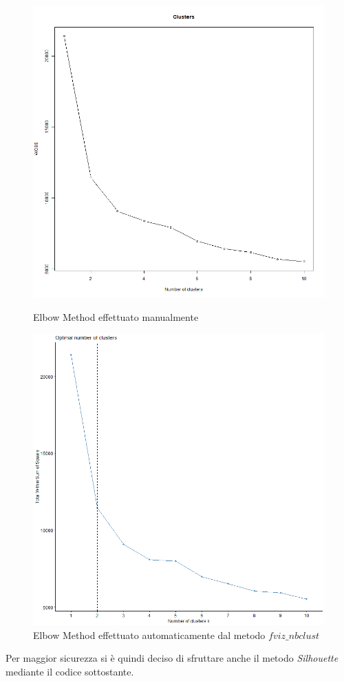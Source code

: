 \documentclass[letterpaper,11pt]{article}
\begin{document}
\begin{figure}[!htb]
   \begin{minipage}{0.48\textwidth}
     \centering
     \includegraphics[width=1\linewidth]{Img/K-MEANS/KMEANS001.png}
     \caption{Elbow Method effettuato manualmente}\label{fig:Elbow1}
   \end{minipage}\hfill
   \begin{minipage}{0.48\textwidth}
     \centering
     \includegraphics[width=1\linewidth]{Img/K-MEANS/KMEANS002.png}
     \caption{Elbow Method effettuato automaticamente dal metodo $fviz\_nbclust$}\label{fig:Elbow2}
   \end{minipage}
\end{figure}
Per maggior sicurezza si è quindi deciso di sfruttare anche il metodo \textit{Silhouette} mediante il codice sottostante.
\end{document}
